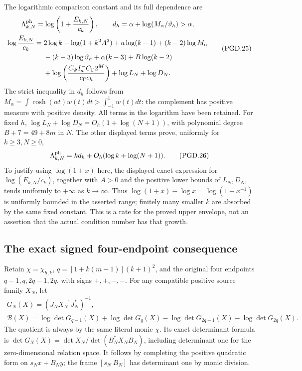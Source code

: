 The logarithmic comparison constant and its full dependence are
\[
 \begin{gathered}
 \Lambda_{k,N}^{\rm ph}
     =\log\left(1+\frac{E_{k,N}}{c_k}\right),\qquad
 d_h=\alpha+\log(M_\alpha/\vartheta_h)>\alpha,\\
 \begin{aligned}
 \log\frac{E_{k,N}}{c_k}
 ={}&2\log k-\log(1+k^2A^2)+a\log(k-1)
       +(k-2)\log M_\alpha\\
    &-(k-3)\log\vartheta_h+\alpha(k-3)+B\log(k-2)\\
    &+\log\left(\frac{C_\Phi I_a^-C_\Gamma2^M}
                         {c_\Gamma c_h}\right)
       +\log L_N+\log D_N .
 \end{aligned}
 \end{gathered}
 \tag{PGD.25}\label{eq:pgd-log-cost}
\]
The strict inequality in \(d_h\) follows from
\(M_\alpha=\int\cosh(\alpha t)w(t)dt>\int_{-1}^1w(t)dt\):
the complement has positive measure with positive density. All terms
in the logarithm have been retained. For fixed \(h\),
\(\log L_N+\log D_N=O_h(1+\log(N+1))\), with polynomial
degree \(B+7=49+8m\) in \(N\). The other displayed terms prove,
uniformly for \(k\geq3,N\geq0\),
\[
 \Lambda_{k,N}^{\rm ph}
       =k d_h+O_h(\log k+\log(N+1)).
 \tag{PGD.26}\label{eq:pgd-cost-rate}
\]
To justify using \(\log(1+x)\) here, the displayed exact expression
for \(\log(E_{k,N}/c_k)\), together with \(A>0\) and the positive
lower bounds of \(L_N,D_N\), tends uniformly to \(+\infty\) as
\(k\to\infty\). Thus
\(\log(1+x)-\log x=\log(1+x^{-1})\) is uniformly bounded in
the asserted range; finitely many smaller \(k\) are absorbed by
the same fixed constant. This is a rate for the proved upper envelope,
not an assertion that the actual condition number has that growth.

\subsection{The exact signed four-endpoint consequence}

Retain \(\chi=\chi_{h,k}\),
\(q=[1+k(m-1)](k+1)^2\), and the original four endpoints
\(q-1,q,2q-1,2q\), with signs \(+,+,-,-\).
For any compatible positive source family \(X_N\), let
\[
 \begin{gathered}
 G_N(X)=(J_NX_N^{-1}J_N^*)^{-1},\\
 \mathcal B(X)=\log\det G_{q-1}(X)+\log\det G_q(X)
       -\log\det G_{2q-1}(X)-\log\det G_{2q}(X).
 \end{gathered}
 \tag{PGD.27}\label{eq:pgd-four-functional}
\]
The quotient is always by the same literal monic \(\chi\).
Its exact determinant formula is
\(\det G_N(X)=\det X_N/\det(B_N^*X_NB_N)\), including determinant
one for the zero-dimensional relation space. It follows by completing
the positive quadratic form on \(s_Nx+B_Ny\); the frame
\([s_N\ B_N]\) has determinant one by monic division.


